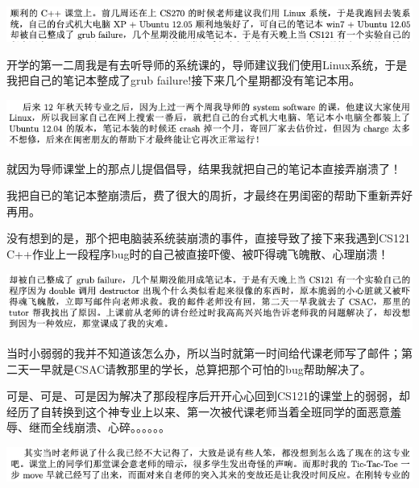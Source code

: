 \documentclass[9pt, b5paper]{article}
\begin{document}
\begin{center}
\includegraphics[width=.9\linewidth]{./pic/backups_plans_20210424_203440.png}
\end{center}

开学的第一二周我是有去听导师的系统课的，导师建议我们使用Linux系统，于是我把自己的笔记本整成了grub failure!接下来几个星期都没有笔记本用。

\begin{center}
\includegraphics[width=.9\linewidth]{./pic/backups_plans_20210425_125121.png}
\end{center}

就因为导师课堂上的那点儿提倡倡导，结果我就把自己的笔记本直接弄崩溃了！

我把自已的笔记本整崩溃后，费了很大的周折，才最终在男闺密的帮助下重新弄好再用。

没有想到的是，那个把电脑装系统装崩溃的事件，直接导致了接下来我遇到CS121 C++作业上一段程序bug时的自己被直接吓傻、被吓得魂飞魄散、心理崩溃！

\begin{center}
\includegraphics[width=.9\linewidth]{./pic/backups_plans_20210424_203454.png}
\end{center}

当时小弱弱的我并不知道该怎么办，所以当时就第一时间给代课老师写了邮件；第二天一早就是CSAC请教那里的学长，总算把那个可怕的bug帮助解决了。

可是、可是、可是因为解决了那段程序后开开心心回到CS121的课堂上的弱弱，却经历了自转换到这个神专业上以来、第一次被代课老师当着全班同学的面恶意羞辱、继而全线崩溃、心碎。。。。。。

\begin{center}
\includegraphics[width=.9\linewidth]{./pic/backups_plans_20210424_203548.png}
\end{center}
\end{document}
